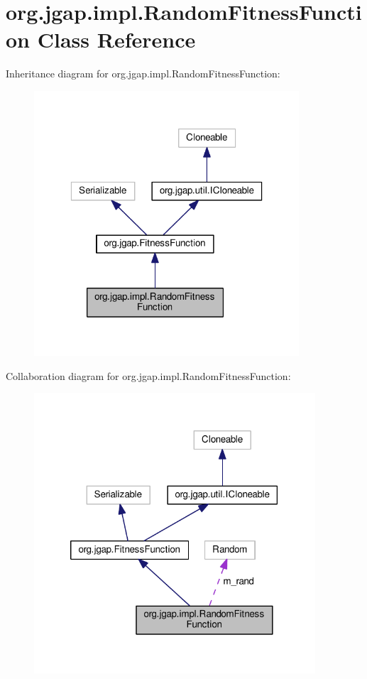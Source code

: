 \hypertarget{classorg_1_1jgap_1_1impl_1_1_random_fitness_function}{\section{org.\-jgap.\-impl.\-Random\-Fitness\-Function Class Reference}
\label{classorg_1_1jgap_1_1impl_1_1_random_fitness_function}
}


Inheritance diagram for org.\-jgap.\-impl.\-Random\-Fitness\-Function\-:
\nopagebreak
\begin{figure}[H]
\begin{center}
\leavevmode
\includegraphics[width=280pt]{classorg_1_1jgap_1_1impl_1_1_random_fitness_function__inherit__graph}
\end{center}
\end{figure}


Collaboration diagram for org.\-jgap.\-impl.\-Random\-Fitness\-Function\-:
\nopagebreak
\begin{figure}[H]
\begin{center}
\leavevmode
\includegraphics[width=297pt]{classorg_1_1jgap_1_1impl_1_1_random_fitness_function__coll__graph}
\end{center}
\end{figure}
